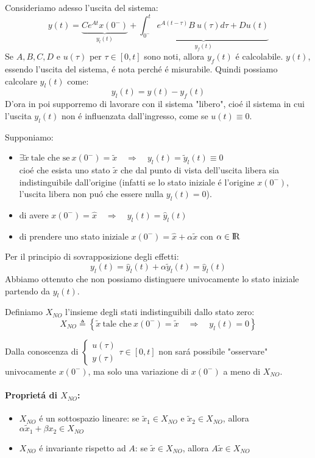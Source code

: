 \documentclass[../main.tex]{subfiles}
\begin{document}
		Consideriamo adesso l'uscita del sistema:
		\[
			y(t) = \underbrace{Ce^{At}x(0^{-})}_{y_l(t)} + \underbrace{\int_{0^{-}}^{t} e^{A(t-\tau)} B\ u(\tau) d\tau + Du(t)}_{y_f(t)}
		\]
		Se $ A, B, C, D $ e $ u(\tau) $ per $ \tau \in [0, t] $ sono noti, allora $ y_f(t) $ \'e calcolabile. $ y(t) $, essendo l'uscita del sistema, \'e nota perch\'e \'e misurabile. Quindi possiamo calcolare $ y_l(t) $ come:
		\[
			y_l(t) = y(t) - y_f(t)
		\]
		D'ora in poi supporremo di lavorare con il sistema "libero", cio\'e il sistema in cui l'uscita $ y_l(t) $ non \'e influenzata dall'ingresso, come se $ u(t) \equiv 0 $.
		\newline
		
		Supponiamo:
		\begin{itemize}
			\item
				$ \exists \tilde x\ \text{tale che se}\ x(0^{-}) = \tilde x \quad\Rightarrow\quad y_l(t) = \tilde y_l(t) \equiv 0 $\\
				cio\'e che esista uno stato $ \tilde x $ che dal punto di vista dell'uscita libera sia indistinguibile dall'origine (infatti se lo stato iniziale \'e l'origine $ x(0^{-}) $, l'uscita libera non pu\'o che essere nulla $ y_l(t) = 0 $).
			\item
				di avere $ x(0^{-}) = \hat x \quad\Rightarrow\quad y_l(t) = \hat y_l(t) $
			\item 
				di prendere uno stato iniziale $ x(0^{-}) = \hat x + \alpha \tilde x $ con $ \alpha \in \rm I\!R $
		\end{itemize}
		Per il principio di sovrapposizione degli effetti:
		\[
			y_l(t) = \hat y_l(t) + \alpha \tilde y_l(t) = \hat y_l(t)
		\]
		Abbiamo ottenuto che non possiamo distinguere univocamente lo stato iniziale partendo da $ y_l(t) $.
		
		\begin{definition}
			Definiamo $ X_{NO} $ l'insieme degli stati indistinguibili dallo stato zero:
			\[
				X_{NO} \triangleq \left\lbrace \tilde x\ \text{tale che}\ x(0^{-}) = \tilde x \quad\Rightarrow\quad y_l(t) = 0 \right\rbrace
			\]
		\end{definition}
	
		Dalla conoscenza di $ \begin{cases} u(\tau)\\ y(\tau) \end{cases} \tau \in [0,t] $ non sar\'a possibile "osservare" univocamente $ x(0^{-}) $, ma solo una variazione di $ x(0^{-}) $ a meno di $ X_{NO} $.
		
		\paragraph{Propriet\'a di $ X_{NO} $:}
			\begin{itemize}
				\item 
					$ X_{NO} $ \'e un sottospazio lineare: se $ \tilde x_1 \in X_{NO} $ e $ \tilde x_2 \in X_{NO} $, allora $ \alpha \tilde x_1 + \beta x_2 \in X_{NO} $
				\item 
					$ X_{NO} $ \'e invariante rispetto ad $ A $: se $ \tilde x \in X_{NO} $, allora $ A \tilde x \in X_{NO} $
			\end{itemize}
	
\end{document}
